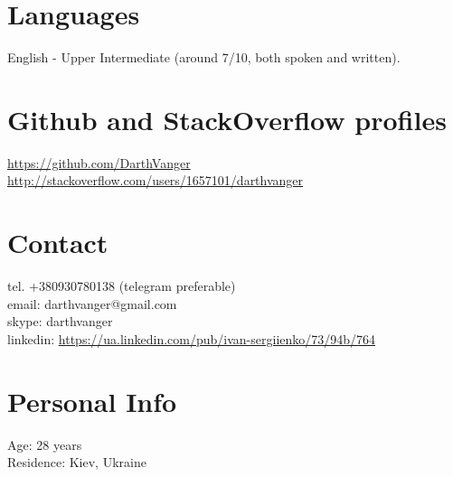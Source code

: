 \documentclass[a4paper, 14pt]{article}
\begin{document}
\section{Languages}
	English - Upper Intermediate (around 7/10, both spoken and written).

\section{Github and StackOverflow profiles}
  \url{https://github.com/DarthVanger} \\
  \url{http://stackoverflow.com/users/1657101/darthvanger}

\section{Contact}
	tel. +380930780138 (telegram preferable) \\
	email: darthvanger@gmail.com \\
  skype: darthvanger \\
  linkedin: \url{https://ua.linkedin.com/pub/ivan-sergiienko/73/94b/764} \\
\section{Personal Info}
	Age: 28 years \\
	Residence: Kiev, Ukraine
\end{document}
